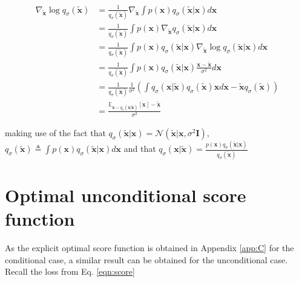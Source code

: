 \documentclass{article} \usepackage{iclr2021_conference_notitle,times}
\theoremstyle{definition}
\theoremstyle{definition}
\begin{document}
\begin{align*}
     \nabla_{\boldsymbol{\tilde{x}}} \log q_\sigma(\boldsymbol{\tilde{x}}) &= \frac{1}{q_\sigma(\boldsymbol{\tilde{x}})} \nabla_{\boldsymbol{\tilde{x}}} \int p(\boldsymbol{x}) q_\sigma(\boldsymbol{\tilde{x}} | \boldsymbol{x}) d\boldsymbol{x} \\
    &= \frac{1}{q_\sigma(\boldsymbol{\tilde{x}})} \int p(\boldsymbol{x}) \nabla_{\boldsymbol{\tilde{x}}} q_\sigma(\boldsymbol{\tilde{x}} | \boldsymbol{x}) d\boldsymbol{x} \\
    &= \frac{1}{q_\sigma(\boldsymbol{\tilde{x}})} \int p(\boldsymbol{x}) q_{\sigma}(\boldsymbol{\tilde{x}}|\boldsymbol{x}) \nabla_{\boldsymbol{\tilde{x}}} \log q_{\sigma}(\boldsymbol{\tilde{x}}|\boldsymbol{x}) d\boldsymbol{x} \\ &= \frac{1}{q_\sigma(\boldsymbol{\tilde{x}})} \int p(\boldsymbol{x}) q_{\sigma}(\boldsymbol{\tilde{x}}|\boldsymbol{x}) \frac{\boldsymbol{x}-\boldsymbol{\tilde{x}}}{\sigma^2} d\boldsymbol{x} \\
    &= \frac{1}{q_\sigma(\boldsymbol{\tilde{x}})} \frac{1}{\sigma^2} \left(\int q_\sigma(\boldsymbol{x} | \boldsymbol{\tilde{x}}) q_\sigma(\boldsymbol{\tilde{x}}) \boldsymbol{x} d\boldsymbol{x} - \boldsymbol{\tilde{x}} q_\sigma(\boldsymbol{\tilde{x}})\right) \\
    &= \frac{\mathbb{E}_{\boldsymbol{x} \sim q_\sigma(\boldsymbol{x} | \boldsymbol{\tilde{x}})}[\boldsymbol{x}] - \boldsymbol{\tilde{x}}}{\sigma^2}
\end{align*}

making use of the fact that  $q_\sigma(\boldsymbol{\boldsymbol{\tilde{x}}}| \boldsymbol{x}) = \mathcal{N}(\boldsymbol{\boldsymbol{\tilde{x}}} | \boldsymbol{x}, \sigma^2 \boldsymbol{I})$, $q_\sigma(\boldsymbol{\boldsymbol{\tilde{x}}}) \triangleq \int p(\boldsymbol{x})q_\sigma(\boldsymbol{\boldsymbol{\tilde{x}}}|\boldsymbol{x})d\boldsymbol{x}$ and that 
$q_\sigma(\boldsymbol{x} | \boldsymbol{\boldsymbol{\tilde{x}}}) = \frac{p(\boldsymbol{x})q_\sigma(\boldsymbol{\boldsymbol{\tilde{x}}}|\boldsymbol{x})}{q_\sigma(\boldsymbol{\boldsymbol{\tilde{x}}})}$


\section{Optimal unconditional score function}
\label{app:D}

As the explicit optimal score function is obtained in Appendix \ref{app:C} for the conditional case, a similar result can be obtained for the unconditional case. Recall the loss from Eq. \ref{eqn:score}
\end{document}
